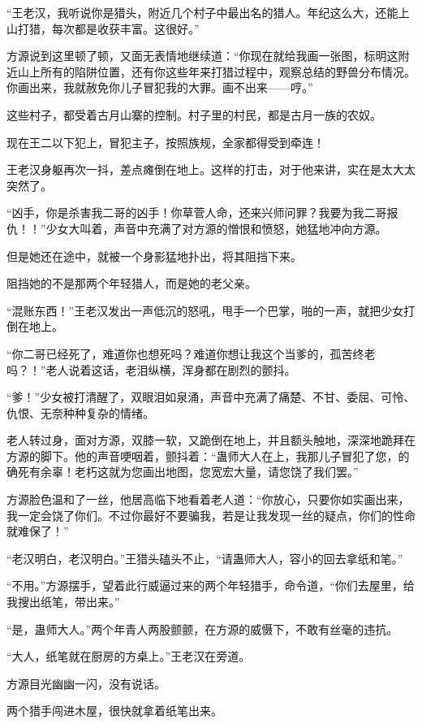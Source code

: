 \begin{this_body}
“王老汉，我听说你是猎头，附近几个村子中最出名的猎人。年纪这么大，还能上山打猎，每次都是收获丰富。这很好。”

方源说到这里顿了顿，又面无表情地继续道：“你现在就给我画一张图，标明这附近山上所有的陷阱位置，还有你这些年来打猎过程中，观察总结的野兽分布情况。你画出来，我就赦免你儿子冒犯我的大罪。画不出来——哼。”

这些村子，都受着古月山寨的控制。村子里的村民，都是古月一族的农奴。

现在王二以下犯上，冒犯主子，按照族规，全家都得受到牵连！

王老汉身躯再次一抖，差点瘫倒在地上。这样的打击，对于他来讲，实在是太大太突然了。

“凶手，你是杀害我二哥的凶手！你草菅人命，还来兴师问罪？我要为我二哥报仇！！”少女大叫着，声音中充满了对方源的憎恨和愤怒，她猛地冲向方源。

但是她还在途中，就被一个身影猛地扑出，将其阻挡下来。

阻挡她的不是那两个年轻猎人，而是她的老父亲。

“混账东西！”王老汉发出一声低沉的怒吼，甩手一个巴掌，啪的一声，就把少女打倒在地上。

“你二哥已经死了，难道你也想死吗？难道你想让我这个当爹的，孤苦终老吗？！”老人说着这话，老泪纵横，浑身都在剧烈的颤抖。

“爹！”少女被打清醒了，双眼泪如泉涌，声音中充满了痛楚、不甘、委屈、可怜、仇恨、无奈种种复杂的情绪。

老人转过身，面对方源，双膝一软，又跪倒在地上，并且额头触地，深深地跪拜在方源的脚下。他的声音哽咽着，颤抖着：“蛊师大人在上，我那儿子冒犯了您，的确死有余辜！老朽这就为您画出地图，您宽宏大量，请您饶了我们罢。”

方源脸色温和了一丝，他居高临下地看着老人道：“你放心，只要你如实画出来，我一定会饶了你们。不过你最好不要骗我，若是让我发现一丝的疑点，你们的性命就难保了！”

“老汉明白，老汉明白。”王猎头磕头不止，“请蛊师大人，容小的回去拿纸和笔。”

“不用。”方源摆手，望着此行威逼过来的两个年轻猎手，命令道，“你们去屋里，给我搜出纸笔，带出来。”

“是，蛊师大人。”两个年青人两股颤颤，在方源的威慑下，不敢有丝毫的违抗。

“大人，纸笔就在厨房的方桌上。”王老汉在旁道。

方源目光幽幽一闪，没有说话。

两个猎手闯进木屋，很快就拿着纸笔出来。


\end{this_body}
